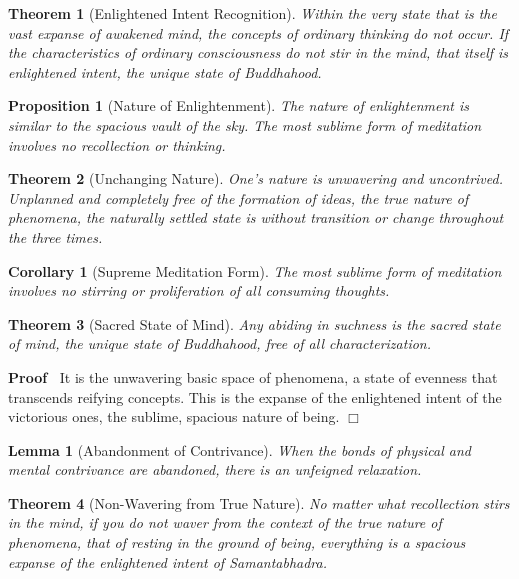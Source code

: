 \documentclass{article}
\newenvironment{proof}{\noindent\textbf{Proof\ }}{\hspace*{\fill}$\Box$\medskip}
\newtheorem{corollary}{Corollary}
\newtheorem{lemma}{Lemma}
\newtheorem{proposition}{Proposition}
{\theorembodyfont{\rmfamily}\newtheorem{remark}{Remark}}
\newtheorem{theorem}{Theorem}
\begin{document}
\begin{theorem}
  [Enlightened Intent Recognition] Within the very state that is the vast
  expanse of awakened mind, the concepts of ordinary thinking do not occur. If
  the characteristics of ordinary consciousness do not stir in the mind, that
  itself is enlightened intent, the unique state of Buddhahood.
\end{theorem}

\begin{proposition}
  [Nature of Enlightenment] The nature of enlightenment is similar to the
  spacious vault of the sky. The most sublime form of meditation involves no
  recollection or thinking.
\end{proposition}

\begin{theorem}
  [Unchanging Nature] One's nature is unwavering and uncontrived. Unplanned
  and completely free of the formation of ideas, the true nature of phenomena,
  the naturally settled state is without transition or change throughout the
  three times.
\end{theorem}

\begin{corollary}
  [Supreme Meditation Form] The most sublime form of meditation involves no
  stirring or proliferation of all consuming thoughts.
\end{corollary}

\begin{theorem}
  [Sacred State of Mind] Any abiding in suchness is the sacred state of mind,
  the unique state of Buddhahood, free of all characterization.
\end{theorem}

\begin{proof}
  It is the unwavering basic space of phenomena, a state of evenness that
  transcends reifying concepts. This is the expanse of the enlightened intent
  of the victorious ones, the sublime, spacious nature of being.
\end{proof}

\begin{lemma}
  [Abandonment of Contrivance] When the bonds of physical and mental
  contrivance are abandoned, there is an unfeigned relaxation.
\end{lemma}

\begin{theorem}
  [Non-Wavering from True Nature] No matter what recollection stirs in the
  mind, if you do not waver from the context of the true nature of phenomena,
  that of resting in the ground of being, everything is a spacious expanse of
  the enlightened intent of Samantabhadra.
\end{theorem}
\end{document}
